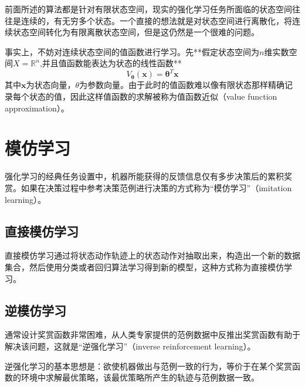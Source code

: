 前面所述的算法都是针对有限状态空间，现实的强化学习任务所面临的状态空间往往是连续的，有无穷多个状态。一个直接的想法就是对状态空间进行离散化，将连续状态空间转化为有限离散状态空间，但是这仍然是一个很难的问题。

事实上，不妨对连续状态空间的值函数进行学习。先**假定状态空间为$n$维实数空间$X=\mathbb R^n$,并且值函数能表达为状态的线性函数**
\begin{equation}
V_{\mathbf \theta}(\mathbf x)=\mathbf\theta^T\mathbf x
\end{equation}
其中$\mathbf x$为状态向量，$\theta$为参数向量。由于此时的值函数难以像有限状态那样精确记录每个状态的值，因此这样值函数的求解被称为值函数近似（value function approximation）。

\section{模仿学习}

强化学习的经典任务设置中，机器所能获得的反馈信息仅有多步决策后的累积奖赏。如果在决策过程中参考决策范例进行决策的方式称为“模仿学习”（imitation learning）。

\subsection{直接模仿学习}

直接模仿学习通过将状态动作轨迹上的状态动作对抽取出来，构造出一个新的数据集合，然后使用分类或者回归算法学习得到新的模型，这种方式称为直接模仿学习。

\subsection{逆模仿学习}

通常设计奖赏函数非常困难，从人类专家提供的范例数据中反推出奖赏函数有助于解决该问题，这就是“逆强化学习”（inverse reinforcement learning）。

逆强化学习的基本思想是：欲使机器做出与范例一致的行为，等价于在某个奖赏函数的环境中求解最优策略，该最优策略所产生的轨迹与范例数据一致。
